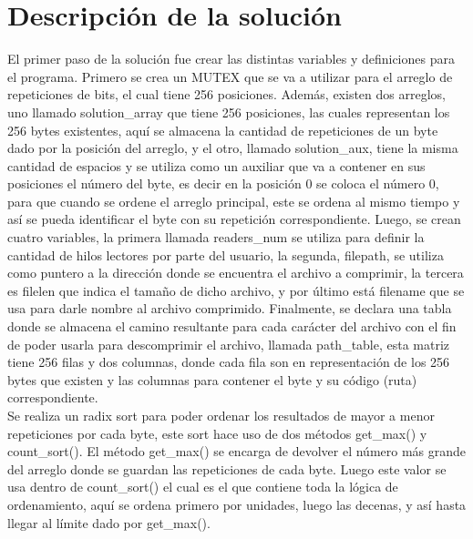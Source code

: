 \documentclass[12pt, article, natbib]{IEEEtran}
\begin{document}
\section{Descripción de la solución}
El primer paso de la solución fue crear las distintas variables y definiciones para el programa. Primero se crea un MUTEX que se va a utilizar para el arreglo de repeticiones de bits, el cual tiene 256 posiciones.\cite{cppdev_2010_c} \cite{manrow_2011_c} Además, existen dos arreglos, uno llamado solution\_array que tiene 256 posiciones, las cuales representan los 256 bytes existentes, aquí se almacena la cantidad de repeticiones de un byte dado por la posición del arreglo, y el otro, llamado solution\_aux, tiene la misma cantidad de espacios y se utiliza como un auxiliar que va a contener en sus posiciones el número del byte, es decir en la posición 0 se coloca el número 0, para que cuando se ordene el arreglo principal, este se ordena al mismo tiempo y así se pueda identificar el byte con su repetición correspondiente. Luego, se crean cuatro variables, la primera llamada readers\_num se utiliza para definir la cantidad de hilos lectores por parte del usuario, la segunda, filepath, se utiliza como puntero a la dirección donde se encuentra el archivo a comprimir, la tercera es filelen que indica el tamaño de dicho archivo, y por último está filename que se usa para darle nombre al archivo comprimido. Finalmente, se declara una tabla donde se almacena el camino resultante para cada carácter del archivo con el fin de poder usarla para descomprimir el archivo, llamada path\_table, esta matriz tiene 256 filas y dos columnas, donde cada fila son en representación de los 256 bytes que existen y las columnas para contener el byte y su código (ruta) correspondiente.\\

Se realiza un radix sort para poder ordenar los resultados de mayor a menor repeticiones por cada byte, este sort hace uso de dos métodos get\_max() y count\_sort(). El método get\_max() se encarga de devolver el número más grande del arreglo donde se guardan las repeticiones de cada byte. Luego este valor se usa dentro de count\_sort() el cual es el que contiene toda la lógica de ordenamiento, aquí se ordena primero por unidades, luego las decenas, y así hasta llegar al límite dado por get\_max().\cite{geeksforgeeks_2013_radix}\\
\end{document}
